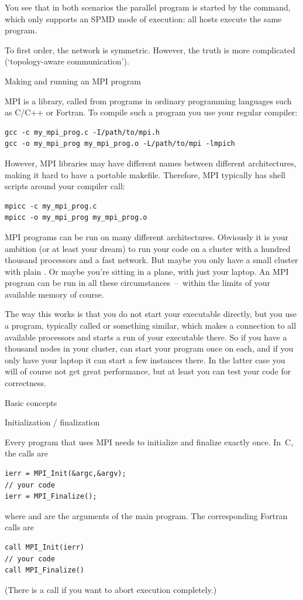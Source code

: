 You see that in both scenarios the parallel program is started
by the  command, which only supports
an \ac{SPMD} mode of execution: all hosts execute the same program.

To first order, the network is symmetric. However, the truth is more 
complicated (`topology-aware communication').

 {Making and running an MPI program}

MPI is a library, called from programs in ordinary programming languages
such as C/C++ or Fortran. To compile such a program you use your regular
compiler:
\begin{verbatim}
gcc -c my_mpi_prog.c -I/path/to/mpi.h
gcc -o my_mpi_prog my_mpi_prog.o -L/path/to/mpi -lmpich
\end{verbatim}
However, MPI libraries may have different names between different
architectures, making it hard to have a portable makefile. Therefore,
MPI typically has shell scripts around your compiler call:
\begin{verbatim}
mpicc -c my_mpi_prog.c
mpicc -o my_mpi_prog my_mpi_prog.o
\end{verbatim}

MPI programs can be run on many different architectures. Obviously it
is your ambition (or at least your dream) to run your code on a
cluster with a hundred thousand processors and a fast network. But
maybe you only have a small cluster with
plain . Or maybe you're sitting in a plane, with
just your laptop. An MPI program can be run in all these
circumstances~--~within the limits of your available memory of course.

The way this works is that you do not start your executable directly,
but you use a program, typically called  or
something similar, which makes a connection to all available
processors and starts a run of your executable there. So if you have a
thousand nodes in your cluster,  can start your program once
on each, and if you only have your laptop it can start a few instances
there. In the latter case you will of course not get great
performance, but at least you can test your code for correctness.

 {Basic concepts}

 {Initialization / finalization}

Every program that uses MPI needs to initialize and finalize exactly
once. In~C, the calls are
\begin{verbatim}
ierr = MPI_Init(&argc,&argv);
// your code
ierr = MPI_Finalize();
\end{verbatim}
where  and  are the arguments of the main program.
%
The corresponding Fortran calls are
\begin{verbatim}
call MPI_Init(ierr)
// your code
call MPI_Finalize()
\end{verbatim}
(There is a call  if you want to abort execution
completely.)

